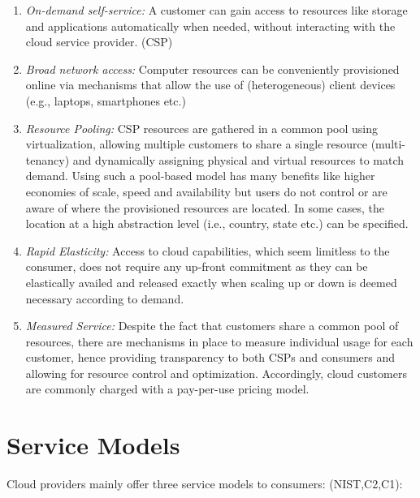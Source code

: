 \begin{enumerate} [I]
    \item \textit{On-demand self-service:} A customer can gain access to resources like storage and applications automatically when needed, without interacting with the cloud service provider. (CSP) 

    \item \textit{Broad network access:} Computer resources can be conveniently provisioned online via mechanisms that allow the use of (heterogeneous) client devices (e.g., laptops, smartphones etc.)

    \item \textit{Resource Pooling:} CSP resources are gathered in a common pool using virtualization, allowing multiple customers to share a single resource (multi-tenancy) and dynamically assigning physical and virtual resources to match demand. Using such a pool-based model has many benefits like higher economies of scale, speed and availability but users do not control or are aware of where the provisioned resources are located. In some cases, the location at a high abstraction level (i.e., country, state etc.) can be specified.

    \item \textit{Rapid Elasticity:} Access to cloud capabilities, which seem limitless to the consumer, does not require any up-front commitment as they can be elastically availed and released exactly when scaling up or down is deemed necessary according to demand.

    \item \textit{Measured Service:} Despite the fact that customers share a common pool of resources, there are mechanisms in place to measure individual usage for each customer, hence providing transparency to both CSPs and consumers and allowing for resource control and optimization. Accordingly, cloud customers are commonly charged with a pay-per-use pricing model.
\end{enumerate}


\section{Service Models}
Cloud providers mainly offer three service models to consumers: (NIST,C2,C1):

